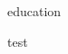 \documentclass[12pt, a4paper]{eon-resume}
\begin{document}
\begin{section}{education}
  \item test
\end{section}
\end{document}
